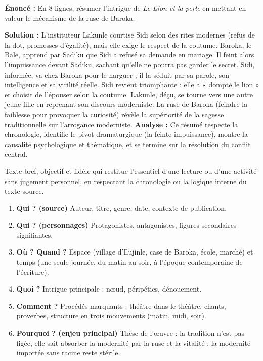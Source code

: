 \documentclass[11pt]{article}
\newcounter{popsec}
\newcounter{popsub}
\newcommand{\courssub}[1]{%
  \stepcounter{popsub}%
  \par\vspace{9pt}\noindent{\popxbold\fontsize{11.5}{13}\selectfont\color{popink}{\color{poporange}\thepopsec.\thepopsub}\hspace{6pt}#1}\par\nopagebreak\vspace{4pt}
}
\begin{document}
\begin{exoresolu}
\textbf{Énoncé :} En 8 lignes, résumer l'intrigue de \emph{Le Lion et la perle} en mettant en valeur le mécanisme de la ruse de Baroka.

\textbf{Solution :}
L'instituteur Lakunle courtise Sidi selon des rites modernes (refus de la dot, promesses d'égalité), mais elle exige le respect de la coutume. Baroka, le Bale, apprend par Sadiku que Sidi a refusé sa demande en mariage. Il feint alors l'impuissance devant Sadiku, sachant qu'elle ne pourra pas garder le secret. Sidi, informée, va chez Baroka pour le narguer ; il la séduit par sa parole, son intelligence et sa virilité réelle. Sidi revient triomphante : elle a « dompté le lion » et choisit de l'épouser selon la coutume. Lakunle, déçu, se tourne vers une autre jeune fille en reprenant son discours moderniste. La ruse de Baroka (feindre la faiblesse pour provoquer la curiosité) révèle la supériorité de la sagesse traditionnelle sur l'arrogance moderniste.
\tcblower
\textbf{Analyse :} Ce résumé respecte la chronologie, identifie le pivot dramaturgique (la feinte impuissance), montre la causalité psychologique et thématique, et se termine sur la résolution du conflit central.
\end{exoresolu}

\courssub{Technique du compte rendu}

\begin{definition}
Texte bref, objectif et fidèle qui restitue l'essentiel d'une lecture ou d'une activité sans jugement personnel, en respectant la chronologie ou la logique interne du texte source.
\end{definition}

\begin{methode}
\begin{enumerate}
    \item \textbf{Qui ? (source)} Auteur, titre, genre, date, contexte de publication.
    \item \textbf{Qui ? (personnages)} Protagonistes, antagonistes, figures secondaires signifiantes.
    \item \textbf{Où ? Quand ?} Espace (village d'Ilujinle, case de Baroka, école, marché) et temps (une seule journée, du matin au soir, à l'époque contemporaine de l'écriture).
    \item \textbf{Quoi ?} Intrigue principale : nœud, péripéties, dénouement.
    \item \textbf{Comment ?} Procédés marquants : théâtre dans le théâtre, chants, proverbes, structure en trois mouvements (matin, midi, soir).
    \item \textbf{Pourquoi ? (enjeu principal)} Thèse de l'œuvre : la tradition n'est pas figée, elle sait absorber la modernité par la ruse et la vitalité ; la modernité importée sans racine reste stérile.
\end{enumerate}
\end{methode}
\end{document}
